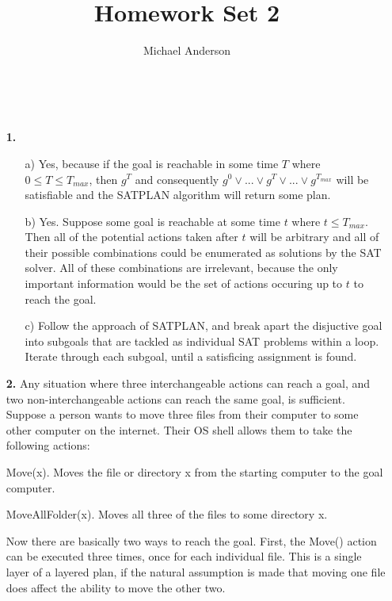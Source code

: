 \documentclass{article}
\author{Michael Anderson}
\title{Homework Set 2}
\begin{document}
\maketitle
{}
\\
\flushleft
\newpage

\begin{enumerate}
\item[\textbf{1.}]

\begin{enumerate}
\item[a)]
Yes, because if the goal is reachable in some time $T$ where 
$0 \le T \le T_{max}$, then $g^T$ and consequently 
$g^0 \vee ... \vee g^T \vee ... \vee g^{T_{max}}$ will be satisfiable
and the SATPLAN algorithm will return some plan.

\item[b)]
Yes. Suppose some goal is reachable at some time $t$ where $t \le T_{max}$.
Then all of the potential actions taken after $t$ will be arbitrary and all of
their possible combinations could be enumerated as solutions by the SAT solver.
All of these combinations are irrelevant, because the only important
information would be the set of actions occuring up to $t$ to reach the goal.

\item[c)]
Follow the approach of SATPLAN, and break apart the disjuctive goal into
subgoals that are tackled as individual SAT problems within a loop. Iterate
through each subgoal, until a satisficing assignment is found.

\end{enumerate}

\item[\textbf{2.}]
Any situation where three interchangeable actions can reach a goal, and two
non-interchangeable actions can reach the same goal, is sufficient. Suppose a
person wants to move three files from their computer to some other computer on
the internet. Their OS shell allows them to take the following actions:

Move(x). Moves the file or directory x from the starting computer to the goal
computer.

MoveAllFolder(x). Moves all three of the files to some directory x.

Now there are basically two ways to reach the goal. First, the Move() action
can be executed three times, once for each individual file. This is a single
layer of a layered plan, if the natural assumption is made that moving one
file does affect the ability to move the other two.


\end{enumerate}
\end{document}
